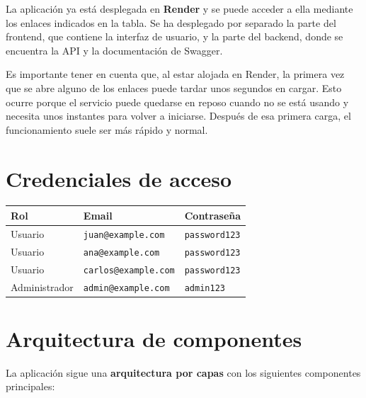 \documentclass[12pt, a4paper]{article}
\begin{document}
La aplicación ya está desplegada en \textbf{Render} y se puede acceder a ella mediante
los enlaces indicados en la tabla. Se ha desplegado por separado la parte del frontend,
que contiene la interfaz de usuario, y la parte del backend, donde se encuentra la API
y la documentación de Swagger.

Es importante tener en cuenta que, al estar alojada en Render, la primera vez que se
abre alguno de los enlaces puede tardar unos segundos en cargar. Esto ocurre porque el
servicio puede quedarse en reposo cuando no se está usando y necesita unos instantes
para volver a iniciarse. Después de esa primera carga, el funcionamiento suele ser más
rápido y normal.

\section{Credenciales de acceso}

\begin{center}
\begin{tabular}{lll}
  \toprule
  \textbf{Rol} & \textbf{Email} & \textbf{Contraseña} \\
  \midrule
  Usuario       & \texttt{juan@example.com} & \texttt{password123} \\
  Usuario & \texttt{ana@example.com}   & \texttt{password123} \\
  Usuario & \texttt{carlos@example.com}   & \texttt{password123} \\
  Administrador & \texttt{admin@example.com}   & \texttt{admin123} \\
  \bottomrule
\end{tabular}
\end{center}

\section{Arquitectura de componentes}

La aplicación sigue una \textbf{arquitectura por capas} con los siguientes componentes principales:
\end{document}
